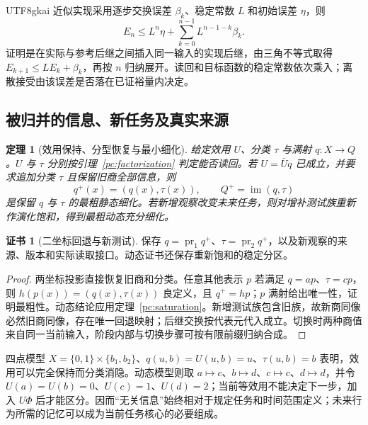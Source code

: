 \documentclass[11pt,a4paper]{article}
\theoremstyle{plain}
\newtheorem{theorem}{定理}[section]
\theoremstyle{definition}
\newtheorem*{certificate}{证书}
\theoremstyle{remark}
\begin{document}
\begin{CJK*}{UTF8}{gkai}
近似实现采用逐步交换误差 $\beta_k$、稳定常数 $L$ 和初始误差 $\eta$，则
\begin{equation}
\label{pc:eq-error}
 E_n\le L^n\eta+\sum_{k=0}^{n-1}L^{n-1-k}\beta_k.
\end{equation}
证明是在实际与参考后继之间插入同一输入的实现后继，由三角不等式取得 $E_{k+1}\le LE_k+\beta_k$，再按 $n$ 归纳展开。读回和目标函数的稳定常数依次乘入；离散接受由该误差是否落在已证裕量内决定。

\subsection{被归并的信息、新任务及真实来源}

\begin{theorem}[效用保持、分型恢复与最小细化]
\label{pc:refinement}
给定效用 $U$、分类 $\tau$ 与满射 $q:X\to Q$。$U$ 与 $\tau$ 分别按引理~\ref{pc:factorization} 判定能否读回。若 $U=\bar Uq$ 已成立，并要求追加分类 $\tau$ 且保留旧商全部信息，则
\[
 q^+(x)=(q(x),\tau(x)),\qquad Q^+=\operatorname{im}(q,\tau)
\]
是保留 $q$ 与 $\tau$ 的最粗静态细化。若新增观察改变未来任务，则对增补测试族重新作演化饱和，得到最粗动态充分细化。
\end{theorem}
\begin{certificate}[二坐标回退与新测试]
保存 $q=\operatorname{pr}_1q^+$、$\tau=\operatorname{pr}_2q^+$，以及新观察的来源、版本和实际读取接口。动态证书还保存重新饱和的稳定分区。
\end{certificate}
\begin{proof}
两坐标投影直接恢复旧商和分类。任意其他表示 $p$ 若满足 $q=ap$、$\tau=cp$，则 $h(p(x))=(q(x),\tau(x))$ 良定义，且 $q^+=hp$；$p$ 满射给出唯一性，证明最粗性。动态结论应用定理~\ref{pc:saturation}。新增测试族包含旧族，故新商同像必然旧商同像，存在唯一回退映射；后继交换按代表元代入成立。切换时两种商值来自同一当前输入，阶段内部与切换步骤可按有限前缀归纳合成。
\end{proof}

四点模型 $X=\{0,1\}\times\{b_1,b_2\}$、$q(u,b)=U(u,b)=u$、$\tau(u,b)=b$ 表明，效用可以完全保持而分类消隐。动态模型则取 $a\mapsto c$、$b\mapsto d$、$c\mapsto c$、$d\mapsto d$，并令 $U(a)=U(b)=0$、$U(c)=1$、$U(d)=2$；当前等效用不能决定下一步，加入 $U\Phi$ 后才能区分。因而“无关信息”始终相对于规定任务和时间范围定义；未来行为所需的记忆可以成为当前任务核心的必要组成。


\end{CJK*}
\end{document}
